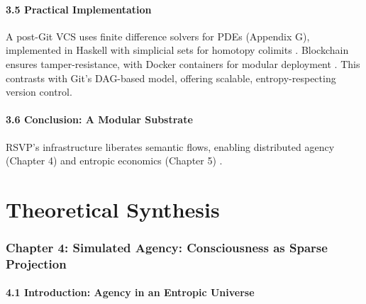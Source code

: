 \documentclass[12pt]{article}
\begin{document}
\subsection{3.5 Practical Implementation}

A post-Git VCS uses finite difference solvers for PDEs (Appendix G), implemented in Haskell with simplicial sets for homotopy colimits \citep{milewski2018}. Blockchain ensures tamper-resistance, with Docker containers for modular deployment \citep{bird1988}. This contrasts with Git’s DAG-based model, offering scalable, entropy-respecting version control.

\subsection{3.6 Conclusion: A Modular Substrate}

RSVP’s infrastructure liberates semantic flows, enabling distributed agency (Chapter 4) and entropic economics (Chapter 5) \citep{whitehead1978}.

\part{Theoretical Synthesis}

\section{Chapter 4: Simulated Agency: Consciousness as Sparse Projection}

\subsection{4.1 Introduction: Agency in an Entropic Universe}
\end{document}
